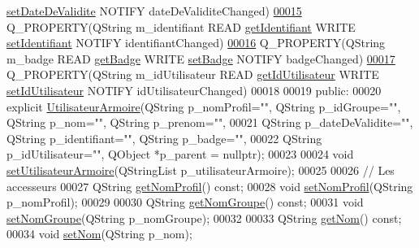 \begin{DoxyCode}
      \hyperlink{class_utilisateur_armoire_abe51b503b17f3d90c7ebe0546ed39cc0}{setDateDeValidite} NOTIFY dateDeValiditeChanged)
\hyperlink{class_utilisateur_armoire_a30cb02e16dd9085a70c6b436781bb756}{00015}     Q\_PROPERTY(QString m\_identifiant READ \hyperlink{class_utilisateur_armoire_a1ba08f24dedbe82671ae4e2930748f31}{getIdentifiant} WRITE 
      \hyperlink{class_utilisateur_armoire_ad1ebf69b10f99b062631a92a3f0ebd2b}{setIdentifiant} NOTIFY identifiantChanged)
\hyperlink{class_utilisateur_armoire_a1a3170a83da04d9f49816a98b226baeb}{00016}     Q\_PROPERTY(QString m\_badge READ \hyperlink{class_utilisateur_armoire_a22e301861ac1c932d47727ae02a17181}{getBadge} WRITE \hyperlink{class_utilisateur_armoire_afee7add8e43ae142c815f0d14491b01e}{setBadge} NOTIFY badgeChanged)
\hyperlink{class_utilisateur_armoire_a7e3072a1a336d5ee1cf87c81d27b11e0}{00017}     Q\_PROPERTY(QString m\_idUtilisateur READ \hyperlink{class_utilisateur_armoire_a6a37ddd972e4de9db1cf3b4caa1d1755}{getIdUtilisateur} WRITE 
      \hyperlink{class_utilisateur_armoire_a51fa6e41f395f6bbe1c3b763eaa93dee}{setIdUtilisateur} NOTIFY idUtilisateurChanged)
00018 
00019 public:
00020     explicit \hyperlink{class_utilisateur_armoire}{UtilisateurArmoire}(QString p\_nomProfil="", QString p\_idGroupe="", QString 
      p\_nom="", QString p\_prenom="",
00021                                 QString p\_dateDeValidite="", QString p\_identifiant="", QString p\_badge="",
00022                                 QString p\_idUtilisateur="", QObject *p\_parent = \textcolor{keywordtype}{nullptr});
00023 
00024     \textcolor{keywordtype}{void} \hyperlink{class_utilisateur_armoire_a523423ac9e15b8260ca7f5ffc84c008d}{setUtilisateurArmoire}(QStringList p\_utilisateurArmoire);
00025 
00026     \textcolor{comment}{// Les accesseurs}
00027     QString \hyperlink{class_utilisateur_armoire_a7ab03056bcfa00c2278488f5a381ac18}{getNomProfil}() const;
00028     \textcolor{keywordtype}{void} \hyperlink{class_utilisateur_armoire_ad71dd9b23c6bc145a64727642b1ac3f5}{setNomProfil}(QString p\_nomProfil);
00029 
00030     QString \hyperlink{class_utilisateur_armoire_a714ef42e6907cf73312a55b7f896682a}{getNomGroupe}() const;
00031     \textcolor{keywordtype}{void} \hyperlink{class_utilisateur_armoire_a4d2361e99dd2e84533ce8a2795607306}{setNomGroupe}(QString p\_nomGroupe);
00032 
00033     QString \hyperlink{class_utilisateur_armoire_a0c7b68d55b8a929a2522cc693b8e250a}{getNom}() const;
00034     \textcolor{keywordtype}{void} \hyperlink{class_utilisateur_armoire_a8a1031cc1ca9a197e49c0adeb1f54923}{setNom}(QString p\_nom);

\end{DoxyCode}
